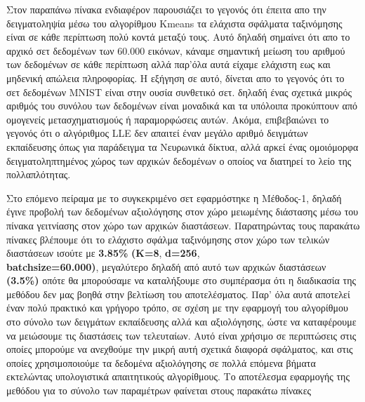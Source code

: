 \par
Στον παραπάνω πίνακα ενδιαφέρον παρουσιάζει το γεγονός ότι έπειτα απο την δειγματοληψία μέσω του αλγορίθμου \textlatin{Kmeans}\textlatin{\cite{kmeans}} τα ελάχιστα σφάλματα ταξινόμησης είναι σε κάθε περίπτωση πολύ κοντά μεταξύ τους. Αυτό δηλαδή σημαίνει ότι απο το αρχικό σετ δεδομένων των 60.000 εικόνων, κάναμε σημαντική μείωση του αριθμού των δεδομένων σε κάθε περίπτωση αλλά παρ'όλα αυτά είχαμε ελάχιστη εως και μηδενική απώλεια πληροφορίας. Η εξήγηση σε αυτό, δίνεται απο το γεγονός ότι το σετ δεδομένων \textlatin{MNIST}\textlatin{\cite{mnist}} είναι στην ουσία συνθετικό σετ. δηλαδή ένας σχετικά μικρός αριθμός του συνόλου των δεδομένων είναι μοναδικά και τα υπόλοιπα προκύπτουν από ομογενείς μετασχηματισμούς ή παραμορφώσεις αυτών. Ακόμα, επιβεβαιώνει το γεγονός ότι ο αλγόριθμος \textlatin{LLE} δεν απαιτεί έναν μεγάλο αριθμό δειγμάτων εκπαίδευσης όπως για παράδειγμα τα Νευρωνικά δίκτυα, αλλά αρκεί ένας ομοιόμορφα δειγματοληπτημένος χώρος των αρχικών δεδομένων ο οποίος να διατηρεί το λείο της πολλαπλότητας.
\par
Στο επόμενο πείραμα με το συγκεκριμένο σετ εφαρμόστηκε η Μέθοδος-1, δηλαδή έγινε προβολή των δεδομένων αξιολόγησης στον χώρο μειωμένης διάστασης μέσω του πίνακα γειτνίασης στον χώρο των αρχικών διαστάσεων. Παρατηρώντας τους παρακάτω πίνακες βλέπουμε ότι το ελάχιστο σφάλμα ταξινόμησης στον χώρο των τελικών διαστάσεων ισούτε με \textbf{3.85\%} \textbf{(\textlatin{K}=8}, \textbf{\textlatin{d}=256}, \\ \textbf{\textlatin{batch\textunderscore size=60.000})}, μεγαλύτερο δηλαδή από αυτό των αρχικών διαστάσεων \textbf{(3.5\%)} οπότε θα μπορούσαμε να καταλήξουμε στο συμπέρασμα ότι η διαδικασία της μεθόδου δεν μας βοηθά στην βελτίωση του αποτελέσματος. Παρ' όλα αυτά αποτελεί έναν πολύ πρακτικό και γρήγορο τρόπο, σε σχέση με την εφαρμογή του αλγορίθμου στο σύνολο των δειγμάτων εκπαίδευσης αλλά και αξιολόγησης, ώστε να καταφέρουμε να μειώσουμε τις διαστάσεις των τελευταίων. Αυτό είναι χρήσιμο σε περιπτώσεις στις οποίες μπορούμε να ανεχθούμε την μικρή αυτή σχετικά διαφορά σφάλματος, και στις οποίες χρησιμοποιούμε τα δεδομένα αξιολόγησης σε πολλά επόμενα βήματα εκτελώντας υπολογιστικά απαιτητικούς αλγορίθμους. Το αποτέλεσμα εφαρμογής της μεθόδου για το σύνολο των παραμέτρων φαίνεται στους παρακάτω πίνακες

